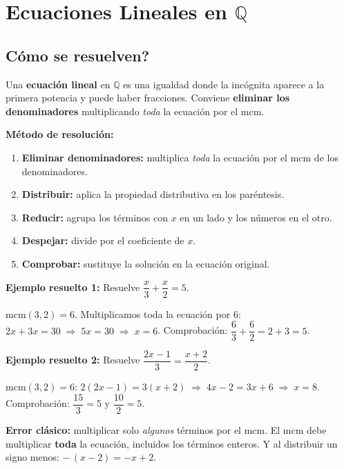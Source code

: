 \documentclass[12pt, letterpaper]{article}
\newcommand{\Q}{\mathbb{Q}}
\begin{document}
\newpage

\section{Ecuaciones Lineales en $\Q$}

\subsection{\textquestiondown Cómo se resuelven?}

Una \textbf{ecuación lineal} en $\Q$ es una igualdad donde la incógnita aparece a la primera potencia y puede haber fracciones. Conviene \textbf{eliminar los denominadores} multiplicando \emph{toda} la ecuación por el mcm.

\begin{cuadropasos}
  \textbf{Método de resolución:}
  \begin{enumerate}[leftmargin=*]
    \item \textbf{Eliminar denominadores:} multiplica \emph{toda} la ecuación por el mcm de los denominadores.
    \item \textbf{Distribuir:} aplica la propiedad distributiva en los paréntesis.
    \item \textbf{Reducir:} agrupa los términos con $x$ en un lado y los números en el otro.
    \item \textbf{Despejar:} divide por el coeficiente de $x$.
    \item \textbf{Comprobar:} sustituye la solución en la ecuación original.
  \end{enumerate}
\end{cuadropasos}

\noindent\textbf{Ejemplo resuelto 1:} Resuelve $\dfrac{x}{3} + \dfrac{x}{2} = 5$.

mcm$(3,2) = 6$. Multiplicamos toda la ecuación por $6$: $2x + 3x = 30 \;\Rightarrow\; 5x = 30 \;\Rightarrow\; x = 6$. Comprobación: $\dfrac{6}{3} + \dfrac{6}{2} = 2 + 3 = 5$. \checkmark

\noindent\textbf{Ejemplo resuelto 2:} Resuelve $\dfrac{2x - 1}{3} = \dfrac{x + 2}{2}$.

mcm$(3,2) = 6$: $2(2x - 1) = 3(x + 2) \;\Rightarrow\; 4x - 2 = 3x + 6 \;\Rightarrow\; x = 8$. \quad Comprobación: $\dfrac{15}{3} = 5$ y $\dfrac{10}{2} = 5$. \checkmark

\begin{cuadroadvertencia}
  \textbf{Error clásico:} multiplicar solo \emph{algunos} términos por el mcm. El mcm debe multiplicar \textbf{toda} la ecuación, incluidos los términos enteros. Y al distribuir un signo menos: $-\,(x - 2) = -x + 2$.
\end{cuadroadvertencia}
\end{document}
